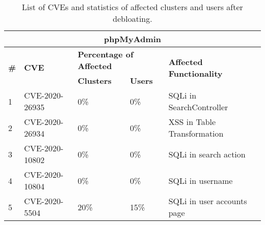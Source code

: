 
\begin{table}[]
    \caption{List of CVEs and statistics of affected clusters and users after debloating.}
    \label{tab:cve_details}
    \centering
    \begin{adjustbox}{max width=0.65\textwidth}
    \begin{tabular}{|lllll|}
    \hline
    \multicolumn{5}{|c|}{\textbf{phpMyAdmin}}                                                                                                                                                                                                 \\ \hline
    \multicolumn{1}{|l|}{\multirow{2}{*}{\textbf{\#}}} & \multicolumn{1}{l|}{\multirow{2}{*}{\textbf{CVE}}} & \multicolumn{2}{l|}{\textbf{Percentage of Affected}}                         & \multirow{2}{*}{\textbf{Affected Functionality}} \\ \cline{3-4}
    \multicolumn{1}{|l|}{}            & \multicolumn{1}{l|}{}                 & \multicolumn{1}{l|}{\textbf{Clusters}} & \multicolumn{1}{l|}{\textbf{Users}} &                                 \\ \hline
    \multicolumn{1}{|l|}{1}           & \multicolumn{1}{l|}{CVE-2020-26935}   & \multicolumn{1}{l|}{0\%}                  & \multicolumn{1}{l|}{0\%}               & SQLi in SearchController        \\ \hline
    \multicolumn{1}{|l|}{2}           & \multicolumn{1}{l|}{CVE-2020-26934}   & \multicolumn{1}{l|}{0\%}                  & \multicolumn{1}{l|}{0\%}               & XSS in Table Transformation     \\ \hline
    \multicolumn{1}{|l|}{3}           & \multicolumn{1}{l|}{CVE-2020-10802}   & \multicolumn{1}{l|}{0\%}                  & \multicolumn{1}{l|}{0\%}               & SQLi in search action           \\ \hline
    \multicolumn{1}{|l|}{4}           & \multicolumn{1}{l|}{CVE-2020-10804}   & \multicolumn{1}{l|}{0\%}                  & \multicolumn{1}{l|}{0\%}               & SQLi in username                \\ \hline
    \multicolumn{1}{|l|}{5}           & \multicolumn{1}{l|}{CVE-2020-5504}    & \multicolumn{1}{l|}{20\%}                 & \multicolumn{1}{l|}{15\%}              & SQLi in user accounts page      \\ \hline

\end{tabular}
\end{adjustbox}
\end{table}

